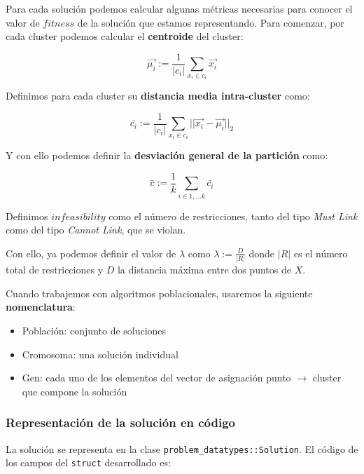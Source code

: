 \documentclass[11pt]{article}
\begin{document}
Para cada solución podemos calcular algunas métricas necesarias para conocer el valor de $fitness$ de la solución que estamos representando. Para comenzar, por cada cluster podemos calcular el \textbf{centroide} del cluster:

\begin{displaymath}
\vec{\mu_i} := \frac{1}{|c_i|} \sum_{x_i \in c_i} \vec{x_i}
\end{displaymath}

Definimos para cada cluster su \textbf{distancia media intra-cluster} como:

\begin{displaymath}
\bar{c_i} := \frac{1}{|c_i|} \sum_{x_i \in c_i} || \vec{x_i} - \vec{\mu_i} ||_2
\end{displaymath}

Y con ello podemos definir la \textbf{desviación general de la partición} como:

\begin{displaymath}
\bar{c} := \frac{1}{k} \sum_{i \in 1, \ldots k} \bar{c_i}
\end{displaymath}

Definimos $infeasibility$ como el número de restricciones, tanto del tipo \emph{Must Link} como del tipo \emph{Cannot Link}, que se violan.

Con ello, ya podemos definir el valor de $\lambda$ como $\lambda := \frac{D}{|R|}$ donde $|R|$ es el número total de restricciones y $D$ la distancia máxima entre dos puntos de $X$.

Cuando trabajemos con algoritmos poblacionales, usaremos la siguiente \textbf{nomenclatura}:

\begin{itemize}
    \item Población: conjunto de soluciones
    \item Cromosoma: una solución individual
    \item Gen: cada uno de los elementos del vector de asignación punto $\rightarrow$ cluster que compone la solución
\end{itemize}

\subsubsection{Representación de la solución en código}

La solución se representa en la clase \lstinline{problem_datatypes::Solution}. El código de los campos del \lstinline{struct} desarrollado es:
\end{document}
